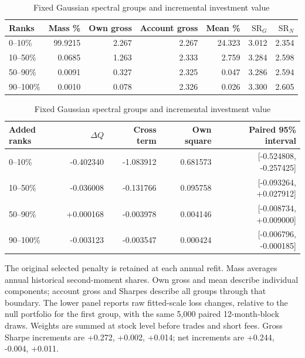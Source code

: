 \begin{table}[!htbp]\centering\small\setlength{\tabcolsep}{5pt}
\caption{Fixed Gaussian spectral groups and incremental investment value}\label{tab:spectral_value}
\begin{tabular}{@{}lrrrrrr@{}}\toprule
Ranks & Mass \% & Own gross & Account gross & Mean \% & $\mathrm{SR}_G$ & $\mathrm{SR}_N$ \\ \midrule
0--10\% & 99.9215 & 2.267 & 2.267 & 24.323 & 3.012 & 2.354 \\
10--50\% & 0.0685 & 1.263 & 2.333 & 2.759 & 3.284 & 2.598 \\
50--90\% & 0.0091 & 0.327 & 2.325 & 0.047 & 3.286 & 2.594 \\
90--100\% & 0.0010 & 0.078 & 2.326 & 0.026 & 3.300 & 2.605 \\
\bottomrule\end{tabular}\par\vspace{5pt}
\par\vspace{9pt}\begin{tabular}{@{}lrrrr@{}}\toprule
Added ranks & $\Delta Q$ & Cross term & Own square & Paired 95\% interval \\ \midrule
0--10\% & -0.402340 & -1.083912 & 0.681573 & [-0.524808, -0.257425] \\
10--50\% & -0.036008 & -0.131766 & 0.095758 & [-0.093264, +0.027912] \\
50--90\% & +0.000168 & -0.003978 & 0.004146 & [-0.008734, +0.009000] \\
90--100\% & -0.003123 & -0.003547 & 0.000424 & [-0.006796, -0.000185] \\
\bottomrule\end{tabular}\par\vspace{5pt}
\begin{minipage}{\textwidth}\footnotesize The original selected penalty is retained at each annual refit. Mass averages annual historical second-moment shares. Own gross and mean describe individual components; account gross and Sharpes describe all groups through that boundary. The lower panel reports raw fitted-scale loss changes, relative to the null portfolio for the first group, with the same 5,000 paired 12-month-block draws. Weights are summed at stock level before trades and short fees. Gross Sharpe increments are +0.272, +0.002, +0.014; net increments are +0.244, -0.004, +0.011.\end{minipage}\end{table}

